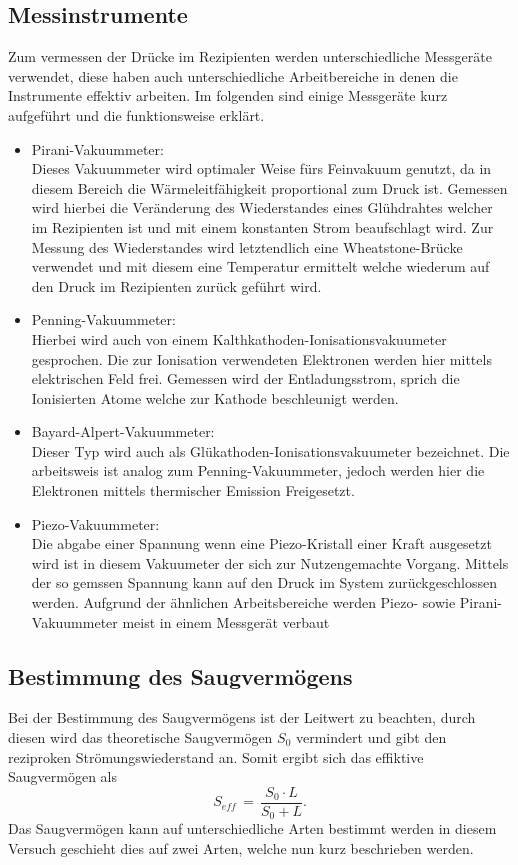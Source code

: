 \subsection{Messinstrumente}
Zum vermessen der Drücke im Rezipienten werden unterschiedliche Messgeräte verwendet, diese haben auch unterschiedliche Arbeitbereiche 
in denen die Instrumente effektiv arbeiten. Im folgenden sind einige Messgeräte kurz aufgeführt und die funktionsweise erklärt.
\begin{itemize}
 \item Pirani-Vakuummeter:\\
 Dieses Vakuummeter wird optimaler Weise fürs Feinvakuum genutzt, da in diesem Bereich die Wärmeleitfähigkeit proportional zum Druck ist.
Gemessen wird hierbei die Veränderung des Wiederstandes eines Glühdrahtes welcher im Rezipienten ist und mit einem konstanten Strom beaufschlagt 
wird. Zur Messung des Wiederstandes wird letztendlich eine Wheatstone-Brücke verwendet und mit diesem eine Temperatur ermittelt welche wiederum 
auf den Druck im Rezipienten zurück geführt wird.
 \item Penning-Vakuummeter:\\
 Hierbei wird auch von einem Kalthkathoden-Ionisationsvakuumeter gesprochen. Die zur Ionisation verwendeten Elektronen werden hier mittels 
 elektrischen Feld frei. Gemessen wird der Entladungsstrom, sprich die Ionisierten Atome welche zur Kathode beschleunigt werden.
 \item Bayard-Alpert-Vakuummeter:\\
 Dieser Typ wird auch als Glükathoden-Ionisationsvakuumeter bezeichnet.
 Die arbeitsweis ist analog zum Penning-Vakuummeter, jedoch werden hier die Elektronen mittels thermischer Emission Freigesetzt.
 \item Piezo-Vakuummeter:\\
 Die abgabe einer Spannung wenn eine Piezo-Kristall einer Kraft ausgesetzt wird ist in diesem Vakuumeter der sich zur Nutzengemachte 
 Vorgang. Mittels der so gemssen Spannung kann auf den Druck im System zurückgeschlossen werden. Aufgrund der ähnlichen Arbeitsbereiche werden Piezo- sowie Pirani-Vakuummeter meist in einem Messgerät verbaut 
\end{itemize}

\subsection{Bestimmung des Saugvermögens}
Bei der Bestimmung des Saugvermögens ist der Leitwert zu beachten, durch diesen wird das theoretische Saugvermögen $S_0$
vermindert und gibt den reziproken Strömungswiederstand an. Somit ergibt sich das effiktive Saugvermögen als 
\begin {equation}
 S_{eff}\,=\, \frac{S_\text{0}\cdot L}{S_\text{0}+L}.
\label{eqn:effsaug}
\end{equation}
Das Saugvermögen kann auf unterschiedliche Arten bestimmt werden in diesem Versuch geschieht dies auf zwei Arten, welche nun 
kurz beschrieben werden.
